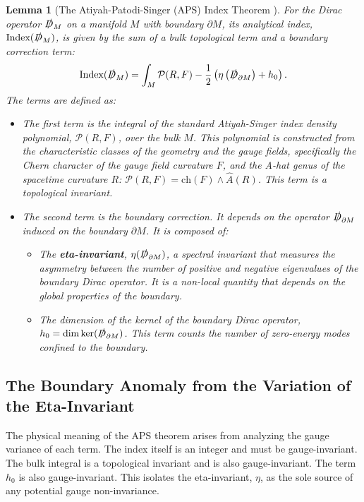 \documentclass[11pt, letterpaper]{report}
\theoremstyle{plain} %
\newtheorem{lemma}[theorem]{Lemma}
\theoremstyle{definition} %
\theoremstyle{remark} %
\newcommand{\BulkM}{M}
\newcommand{\BoundaryM}{\partial\BulkM}
\newcommand{\DiracOpBulk}{\slashed{D}_{\BulkM}}
\newcommand{\DiracOpBoundary}{\slashed{D}_{\BoundaryM}}
\newcommand{\AhatGenus}{\hat{A}}
\newcommand{\EtaInv}{\eta}
\newcommand{\Index}{\text{Index}}
\begin{document}
\begin{lemma}[The Atiyah-Patodi-Singer (APS) Index Theorem \cite{AtiyahPatodiSinger1975}]
\label{lemma:aps_theorem_full_detail}
For the Dirac operator $\DiracOpBulk$ on a manifold $\BulkM$ with boundary $\BoundaryM$, its analytical index, $\Index(\DiracOpBulk)$, is given by the sum of a bulk topological term and a boundary correction term:
\begin{equation}
    \Index(\DiracOpBulk) = \int_{\BulkM} \mathcal{P}(R,F) - \frac{1}{2}\left(\EtaInv\left(\DiracOpBoundary\right) + h_0\right).
    \label{eq:aps_theorem_full_detail}
\end{equation}
The terms are defined as:
\begin{itemize}
    \item The first term is the integral of the standard Atiyah-Singer index density polynomial, $\mathcal{P}(R,F)$, over the bulk $\BulkM$. This polynomial is constructed from the characteristic classes of the geometry and the gauge fields, specifically the Chern character of the gauge field curvature $F$, and the A-hat genus of the spacetime curvature $R$: $\mathcal{P}(R,F) = \text{ch}(F) \wedge \AhatGenus(R)$. This term is a topological invariant.
    \item The second term is the boundary correction. It depends on the operator $\DiracOpBoundary$ induced on the boundary $\BoundaryM$. It is composed of:
        \begin{itemize}
            \item The \textbf{eta-invariant}, $\EtaInv(\DiracOpBoundary)$, a spectral invariant that measures the asymmetry between the number of positive and negative eigenvalues of the boundary Dirac operator. It is a non-local quantity that depends on the global properties of the boundary.
            \item The dimension of the kernel of the boundary Dirac operator, $h_0 = \dim\ker(\DiracOpBoundary)$. This term counts the number of zero-energy modes confined to the boundary.
        \end{itemize}
\end{itemize}
\end{lemma}

\subsection{The Boundary Anomaly from the Variation of the Eta-Invariant}
\label{subsec:eta_variation_anomaly}

The physical meaning of the APS theorem arises from analyzing the gauge variance of each term. The index itself is an integer and must be gauge-invariant. The bulk integral is a topological invariant and is also gauge-invariant. The term $h_0$ is also gauge-invariant. This isolates the eta-invariant, $\EtaInv$, as the sole source of any potential gauge non-invariance.
\end{document}
